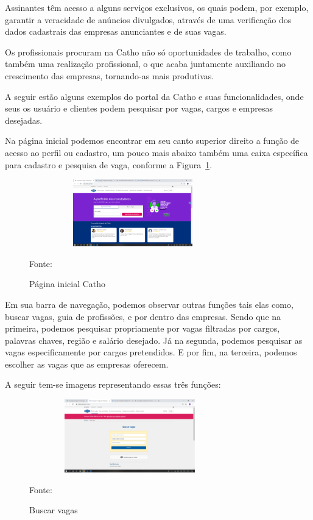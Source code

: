 Assinantes têm acesso a alguns serviços exclusivos, os quais podem, por exemplo, garantir a veracidade de anúncios divulgados, através de uma verificação dos dados cadastrais das empresas anunciantes e de suas vagas.

Os profissionais procuram na Catho não só oportunidades de trabalho, como também uma realização profissional, o que acaba juntamente auxiliando no crescimento das empresas, tornando-as mais produtivas.

A seguir estão alguns exemplos do portal da Catho e suas funcionalidades, onde seus os usuário e clientes podem pesquisar por vagas, cargos e empresas desejadas.

Na página inicial podemos encontrar em seu canto superior direito a função de acesso ao perfil ou cadastro, um pouco mais abaixo também uma caixa específica para cadastro e pesquisa de vaga, conforme a Figura~\hypersetup{linkcolor=black}\ref{fig:Catho}.

\begin{figure}[!h]
	\centering
	\caption{Página inicial Catho }
	\includegraphics[width=340px, height=110px]{./images/cattho.png}
		\label{fig:Catho}
	\par {Fonte: \cite{catho}}
\end{figure}

Em sua barra de navegação, podemos observar outras funções tais elas como, buscar vagas, guia de profissões, e por dentro das empresas. Sendo que na primeira, podemos pesquisar propriamente por vagas filtradas por cargos, palavras chaves, região e salário desejado. Já na segunda, podemos pesquisar as vagas especificamente por cargos pretendidos. E por fim, na terceira, podemos escolher as vagas que as empresas oferecem.

A seguir tem-se imagens representando essas três funções:

\begin{figure}[!h]
	\centering
	\caption{Buscar vagas}
	\includegraphics[width=330px, height=120px]{./images/cattho1.png}
	\par {Fonte: \cite{catho-1}}
\end{figure}


